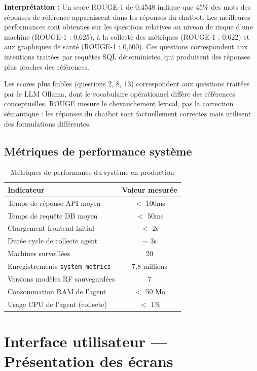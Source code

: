 \textbf{Interprétation :} Un score ROUGE-1 de 0,4548 indique que 45\% des mots des
réponses de référence apparaissent dans les réponses du chatbot. Les meilleures
performances sont obtenues sur les questions relatives au niveau de risque d'une machine
(ROUGE-1 : 0,625), à la collecte des métriques (ROUGE-1 : 0,622) et aux graphiques de
santé (ROUGE-1 : 0,600). Ces questions correspondent aux intentions traitées par requêtes
SQL déterministes, qui produisent des réponses plus proches des références.

Les scores plus faibles (questions 2, 8, 13) correspondent aux questions traitées par
le LLM Ollama, dont le vocabulaire opérationnel diffère des références conceptuelles.
ROUGE mesure le chevauchement lexical, pas la correction sémantique : les réponses du
chatbot sont factuellement correctes mais utilisent des formulations différentes.

\subsection{Métriques de performance système}

\begin{table}[H]
\centering
\caption{Métriques de performance du système en production}
\begin{tabular}{|l|c|}
\hline
\rowcolor{lightblue}
\textbf{Indicateur} & \textbf{Valeur mesurée} \\
\hline
Temps de réponse API moyen & $<$ 100ms \\
\hline
Temps de requête DB moyen & $<$ 50ms \\
\hline
Chargement frontend initial & $<$ 2s \\
\hline
Durée cycle de collecte agent & $\sim$ 3s \\
\hline
Machines surveillées & 20 \\
\hline
Enregistrements \texttt{system\_metrics} & 7,8 millions \\
\hline
Versions modèles RF sauvegardées & 7 \\
\hline
Consommation RAM de l'agent & $<$ 50 Mo \\
\hline
Usage CPU de l'agent (collecte) & $<$ 1\% \\
\hline
\end{tabular}
\end{table}

\section{Interface utilisateur — Présentation des écrans}

